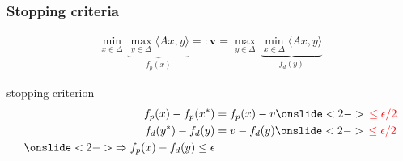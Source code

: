 \documentclass[aspectratio=149]{beamer}
\begin{document}
\begin{frame}
  \frametitle{Stopping criteria}
  \begin{equation}
    \begin{aligned}
      \min_{x \in \Delta} \,\underbrace{\max_{y \in \Delta} \langle Ax, y \rangle}_{f_p(x)} =: \bm{v}  = \max_{y \in \Delta} \, \underbrace{\min_{x \in \Delta} \langle Ax, y \rangle}_{f_d(y)}
    \end{aligned}
  \end{equation}
  \begin{block}{stopping criterion}
    \begin{equation}
      \begin{aligned}
        f_p(x) - f_p(x^*) &= f_p(x) - v \onslide<2->{\textcolor{red}{\, \le \epsilon/2}}\\
        f_d(y^*) - f_d(y) &= v - f_d(y) \onslide<2->{\textcolor{red}{\, \le \epsilon/2}} \\
        \onslide<2->{\Rightarrow f_p(x) - f_d(y) \le \epsilon}
      \end{aligned}
    \end{equation}
  \end{block}
\end{frame}
\end{document}

